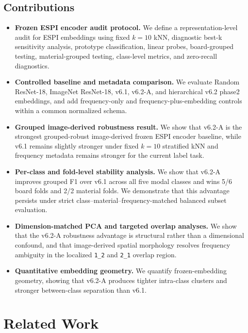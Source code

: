 \documentclass[review,3p,times]{elsarticle}
\begin{document}
\subsection{Contributions}
\begin{itemize}
    \item \textbf{Frozen ESPI encoder audit protocol.} We define a representation-level audit for ESPI embeddings using fixed $k=10$ kNN, diagnostic best-k sensitivity analysis, prototype classification, linear probes, board-grouped testing, material-grouped testing, class-level metrics, and zero-recall diagnostics.
    \item \textbf{Controlled baseline and metadata comparison.} We evaluate Random ResNet-18, ImageNet ResNet-18, v6.1, v6.2-A, and hierarchical v6.2 phase2 embeddings, and add frequency-only and frequency-plus-embedding controls within a common normalized schema.
    \item \textbf{Grouped image-derived robustness result.} We show that v6.2-A is the strongest grouped-robust image-derived frozen ESPI encoder baseline, while v6.1 remains slightly stronger under fixed $k=10$ stratified kNN and frequency metadata remains stronger for the current label task.
    \item \textbf{Per-class and fold-level stability analysis.} We show that v6.2-A improves grouped F1 over v6.1 across all five modal classes and wins 5/6 board folds and 2/2 material folds. We demonstrate that this advantage persists under strict class--material--frequency-matched balanced subset evaluation.
    \item \textbf{Dimension-matched PCA and targeted overlap analyses.} We show that the v6.2-A robustness advantage is structural rather than a dimensional confound, and that image-derived spatial morphology resolves frequency ambiguity in the localized \texttt{1\_2} and \texttt{2\_1} overlap region.
    \item \textbf{Quantitative embedding geometry.} We quantify frozen-embedding geometry, showing that v6.2-A produces tighter intra-class clusters and stronger between-class separation than v6.1.
\end{itemize}

\section{Related Work}
\label{sec:related}
\end{document}
